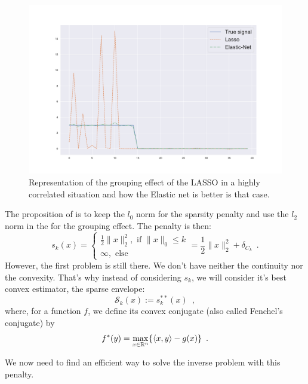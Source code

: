 \documentclass{article}
\begin{document}
\begin{center}
    \begin{figure}[H]
        \centering
        \includegraphics[width=.9\linewidth]{images/Lasso_enet.pdf}
        \caption{Representation of the grouping effect of the LASSO in a highly correlated situation and how the Elastic net is better is that case.}
        \label{fig:lasso_enet}
    \end{figure}
\end{center}



The proposition of \cite{beck} is to keep the $l_0$ norm for the sparsity penalty and use the $l_2$ norm in the \enet for the grouping effect. The penalty is then:
\[s_k(x)=\begin{cases} \frac{1}{2}\|x\|_2^2, \text{ if } \|x\|_0\leq k\\
\infty, \text{ else}\end{cases} = \frac{1}{2}\|x\|_2^2 + \delta_{C_k}\enspace.\]
However, the first problem is still there. We don't have neither the continuity nor the convexity. That's why instead of considering $s_k$, we will consider it's best convex estimator, the sparse envelope:
\[ \mathcal{S}_k(x) := s_k^{**}(x)\enspace,\]
where, for a function $f$, we define its convex conjugate (also called Fenchel's conjugate) by  
\begin{equation}\label{eq:conjugate}
    f^*(y)=\max_{x\in\mathbb{R}^n}\{\langle x, y\rangle - g(x)\}\enspace.
\end{equation}

We now need to find an efficient way to solve the inverse problem with this penalty.

\end{document}
